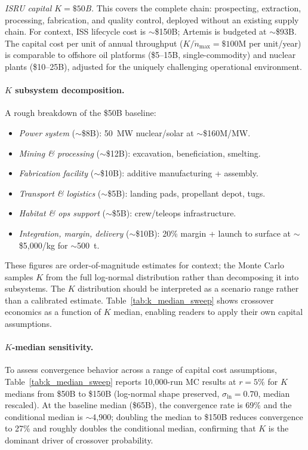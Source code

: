 \documentclass[preprint,12pt]{elsarticle}
\begin{document}
\emph{ISRU capital $K = \$50$B.} This covers the complete chain: prospecting, extraction, processing, fabrication, and quality control, deployed without an existing supply chain. For context, ISS lifecycle cost is $\sim$\$150B; Artemis is budgeted at $\sim$\$93B. The capital cost per unit of annual throughput ($K/\dot{n}_{\max} = \$100$M per unit/year) is comparable to offshore oil platforms (\$5--15B, single-commodity) and nuclear plants (\$10--25B), adjusted for the uniquely challenging operational environment.

\paragraph{$K$ subsystem decomposition.} A rough breakdown of the \$50B baseline:
\begin{itemize}
  \item \emph{Power system} (${\sim}$\$8B): 50~MW nuclear/solar at ${\sim}$\$160M/MW.
  \item \emph{Mining \& processing} (${\sim}$\$12B): excavation, beneficiation, smelting.
  \item \emph{Fabrication facility} (${\sim}$\$10B): additive manufacturing + assembly.
  \item \emph{Transport \& logistics} (${\sim}$\$5B): landing pads, propellant depot, tugs.
  \item \emph{Habitat \& ops support} (${\sim}$\$5B): crew/teleops infrastructure.
  \item \emph{Integration, margin, delivery} (${\sim}$\$10B): 20\% margin + launch to surface at ${\sim}$\$5{,}000/kg for ${\sim}$500~t.
\end{itemize}
These figures are order-of-magnitude estimates for context; the Monte Carlo samples $K$ from the full log-normal distribution rather than decomposing it into subsystems. The $K$ distribution should be interpreted as a scenario range rather than a calibrated estimate. Table~\ref{tab:k_median_sweep} shows crossover economics as a function of $K$ median, enabling readers to apply their own capital assumptions.

\paragraph{$K$-median sensitivity.} To assess convergence behavior across a range of capital cost assumptions, Table~\ref{tab:k_median_sweep} reports 10{,}000-run MC results at $r = 5\%$ for $K$ medians from \$50B to \$150B (log-normal shape preserved, $\sigma_{\ln} = 0.70$, median rescaled). At the baseline median (\$65B), the convergence rate is 69\% and the conditional median is $\sim$4{,}900; doubling the median to \$150B reduces convergence to 27\% and roughly doubles the conditional median, confirming that $K$ is the dominant driver of crossover probability.
\end{document}
